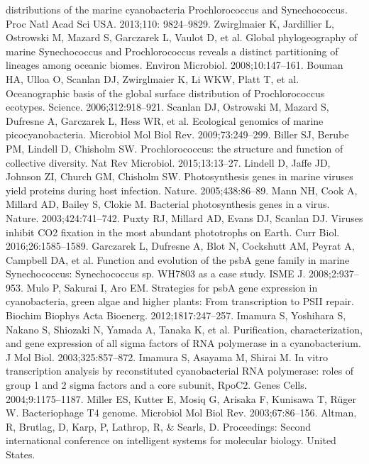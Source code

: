 \documentclass[14pt]{extarticle}
\begin{document}
\begin{thebibliography}{9}
    distributions of the marine cyanobacteria Prochlorococcus and Synechococcus. Proc Natl Acad Sci USA. 2013;110: 
    9824–9829.
     Zwirglmaier K, Jardillier L, Ostrowski M, Mazard S, Garczarek L, Vaulot D, et al. Global phylogeography
    of marine Synechococcus and Prochlorococcus reveals a distinct partitioning of lineages among oceanic biomes.
    Environ Microbiol. 2008;10:147–161.
     Bouman HA, Ulloa O, Scanlan DJ, Zwirglmaier K, Li WKW, Platt T, et al. Oceanographic basis of the 
    global surface distribution of Prochlorococcus ecotypes. Science. 2006;312:918–921.
     Scanlan DJ, Ostrowski M, Mazard S, Dufresne A, Garczarek L, Hess WR, et al. Ecological genomics of 
    marine picocyanobacteria. Microbiol Mol Biol Rev. 2009;73:249–299.
     Biller SJ, Berube PM, Lindell D, Chisholm SW. Prochlorococcus: the structure and function of collective
    diversity. Nat Rev Microbiol. 2015;13:13–27.
     Lindell D, Jaffe JD, Johnson ZI, Church GM, Chisholm SW. Photosynthesis genes in marine viruses yield 
    proteins during host infection. Nature. 2005;438:86–89.
     Mann NH, Cook A, Millard AD, Bailey S, Clokie M. Bacterial photosynthesis genes in a virus. Nature. 
    2003;424:741–742.
     Puxty RJ, Millard AD, Evans DJ, Scanlan DJ. Viruses inhibit CO2 fixation in the most abundant 
    phototrophs on Earth. Curr Biol. 2016;26:1585–1589.
     Garczarek L, Dufresne A, Blot N, Cockshutt AM, Peyrat A, Campbell DA, et al. Function and evolution of
    the psbA gene family in marine Synechococcus: Synechococcus sp. WH7803 as a case study. ISME J. 2008;2:937–953.
     Mulo P, Sakurai I, Aro EM. Strategies for psbA gene expression in cyanobacteria, green algae and 
    higher plants: From transcription to PSII repair. Biochim Biophys Acta Bioenerg. 2012;1817:247–257.
     Imamura S, Yoshihara S, Nakano S, Shiozaki N, Yamada A, Tanaka K, et al. Purification, 
    characterization, and gene expression of all sigma factors of RNA polymerase in a cyanobacterium. J Mol Biol. 
    2003;325:857–872.
     Imamura S, Asayama M, Shirai M. In vitro transcription analysis by reconstituted cyanobacterial RNA 
    polymerase: roles of group 1 and 2 sigma factors and a core subunit, RpoC2. Genes Cells. 2004;9:1175–1187.
     Miller ES, Kutter E, Mosiq G, Arisaka F, Kunisawa T, Rüger W. Bacteriophage T4 genome. Microbiol Mol 
    Biol Rev. 2003;67:86–156.
       Altman, R, Brutlag, D, Karp, P, Lathrop, R, \& Searls, D. Proceedings: Second international conference on intelligent systems for molecular biology. United States. 
\end{thebibliography}
\end{document}
